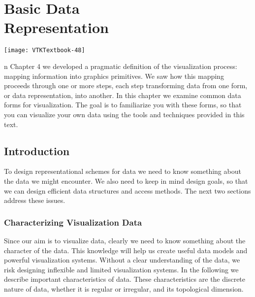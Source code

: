 \chapter[Basic Data Representation]{Basic Data\\ Representation}
\label{chap:basic_data_representation}

\vspace{-9\baselineskip} %
\hfill
 \begin{minipage}{0.5\textwidth}
 \centering
 \texttt{[image: VTKTextbook-48]}
 \end{minipage}
\vspace{2\baselineskip}

n Chapter 4 we developed a pragmatic definition of the visualization process: mapping information into graphics primitives. We saw how this mapping proceeds through one or more steps, each step transforming data from one form, or data representation, into another. In this chapter we examine common data forms for visualization. The goal is to familiarize you with these forms, so that you can visualize your own data using the tools and techniques provided in this text.

\section{Introduction}
To design representational schemes for data we need to know something about the data we might encounter. We also need to keep in mind design goals, so that we can design efficient data structures and access methods. The next two sections address these issues.

\subsection{Characterizing Visualization Data}

Since our aim is to visualize data, clearly we need to know something about the character of the data. This knowledge will help us create useful data models and powerful visualization systems. Without a clear understanding of the data, we risk designing inflexible and limited visualization systems. In the following we describe important characteristics of data. These characteristics are the discrete nature of data, whether it is regular or irregular, and its topological dimension.

